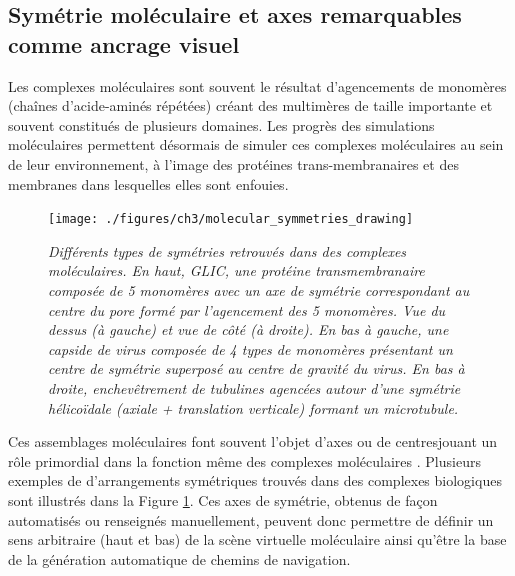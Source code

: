 \subsection{Symétrie moléculaire et axes remarquables comme ancrage visuel}


Les complexes moléculaires sont souvent le résultat d'agencements de monomères (chaînes d'acide-aminés répétées) créant des multimères de taille importante et souvent constitués de plusieurs domaines. Les progrès des simulations moléculaires permettent désormais de simuler ces complexes moléculaires au sein de leur environnement, à l'image des protéines trans-membranaires et des membranes dans lesquelles elles sont enfouies. %

\begin{figure}[h]
  \centering
  {\texttt{[image: ./figures/ch3/molecular\_symmetries\_drawing]}}
    \caption[Types de symétries retrouvées dans l'agencement de complexes protéiques majeurs.]{{\it Différents types de symétries retrouvés dans des complexes moléculaires. En haut, GLIC, une protéine transmembranaire composée de 5 monomères avec un axe de symétrie correspondant au centre du pore formé par l'agencement des 5 monomères. Vue du dessus (à gauche) et vue de côté (à droite). En bas à gauche, une capside de virus composée de 4 types de monomères présentant un centre de symétrie superposé au centre de gravité du virus. En bas à droite, enchevêtrement de tubulines agencées autour d'une symétrie hélicoïdale (axiale + translation verticale) formant un microtubule.}}
  \label{Fig:molecular_symmetries_drawing}
  \hspace{0.2cm}
\end{figure}

Ces assemblages moléculaires  font souvent l'objet d'axes ou de centresjouant un rôle primordial dans la fonction même des complexes moléculaires \cite{goodsell_structural_2000}. Plusieurs exemples de d'arrangements symétriques trouvés dans des complexes biologiques sont illustrés dans la Figure \ref{Fig:molecular_symmetries_drawing}. Ces axes de symétrie, obtenus de façon automatisés ou renseignés manuellement, peuvent donc permettre de définir un sens arbitraire (haut et bas) de la scène virtuelle moléculaire ainsi qu'être la base de la génération automatique de chemins de navigation. 

